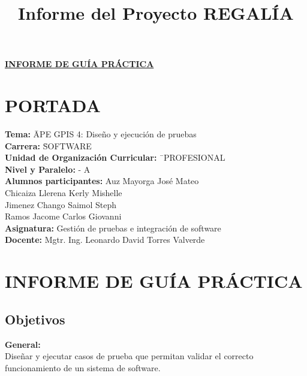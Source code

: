 \documentclass[11pt]{article}
\title{Informe del Proyecto REGALÍA}
\renewcommand{\_}{\textunderscore\allowbreak}
\begin{document}
\titleformat{\section}{\normalfont\Large\bfseries}{\thesection}{1em}{}
\renewcommand{\thesection}{\Roman{section}}
\begin{center}
    \textbf{\underline{\normalsize INFORME DE GUÍA PRÁCTICA}}
\end{center}

\section{PORTADA}

\begin{tabbing}
\textbf{Tema:}\hspace{7cm} \= APE GPIS 4: Diseño y ejecución de pruebas\\
\textbf{Carrera:}\hspace{7cm} \= SOFTWARE \\
\textbf{Unidad de Organización Curricular:} \hspace{1cm} \= \ PROFESIONAL\\
\textbf{Nivel y Paralelo:}  - A\\
\textbf{Alumnos participantes:}  \> Auz Mayorga José Mateo\\
 \> Chicaiza Llerena Kerly Mishelle\\
 \> Jimenez Chango Saimol Steph\\
 \> Ramos Jacome Carlos Giovanni\\
\textbf{Asignatura:} \> Gestión de pruebas e integración de software \\
\textbf{Docente:} \> Mgtr. Ing. Leonardo David Torres Valverde
\end{tabbing}

\section{INFORME DE GUÍA PRÁCTICA}
\titleformat{\section}{\normalfont\Large\bfseries}{\thesection}{1em}{}
\renewcommand{\thesection}{\arabic{section}}

\subsection{Objetivos}
\textbf{General:}\\
Diseñar y ejecutar casos de prueba que permitan validar el correcto funcionamiento de un sistema de software.
\end{document}
